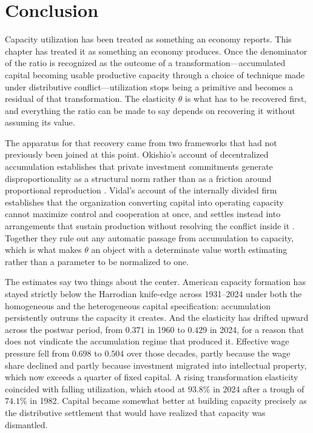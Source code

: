 \section{Conclusion}
\label{sec:conclusion}

Capacity utilization has been treated as something an economy reports.
This chapter has treated it as something an economy produces. Once the
denominator of the ratio is recognized as the outcome of a
transformation---accumulated capital becoming usable productive capacity
through a choice of technique made under distributive
conflict---utilization stops being a primitive and becomes a residual of that
transformation. The elasticity $\theta$ is what has to be recovered
first, and everything the ratio can be made to say depends on recovering
it without assuming its value.

The apparatus for that recovery came from two frameworks that had not
previously been joined at this point. Okishio's account of decentralized
accumulation establishes that private investment commitments generate
disproportionality as a structural norm rather than as a friction around
proportional reproduction \citep{Okishio1961, Okishio2022}. Vidal's
account of the internally divided firm establishes that the organization
converting capital into operating capacity cannot maximize control and
cooperation at once, and settles instead into arrangements that sustain
production without resolving the conflict inside it
\citep{Vidal2022, Vidal2019}. Together they rule out any automatic
passage from accumulation to capacity, which is what makes $\theta$ an
object with a determinate value worth estimating rather than a parameter
to be normalized to one.

The estimates say two things about the center. American capacity
formation has stayed strictly below the Harrodian knife-edge across
1931--2024 under both the homogeneous and the heterogeneous capital
specification: accumulation persistently outruns the capacity it creates.
And the elasticity has drifted upward across the postwar period, from
$0.371$ in 1960 to $0.429$ in 2024, for a reason that does not vindicate
the accumulation regime that produced it. Effective wage pressure fell
from $0.698$ to $0.504$ over those decades, partly because the wage share
declined and partly because investment migrated into intellectual
property, which now exceeds a quarter of fixed capital. A rising
transformation elasticity coincided with falling utilization, which stood
at $93.8\%$ in 2024 after a trough of $74.1\%$ in 1982. Capital became
somewhat better at building capacity precisely as the distributive
settlement that would have realized that capacity was dismantled.

